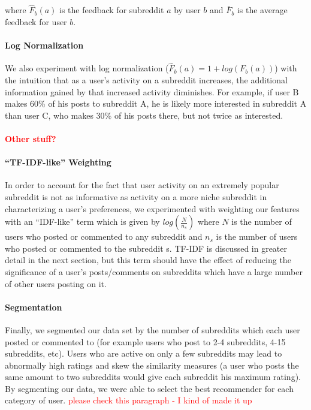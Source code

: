 \documentclass{article}
\begin{document}
where $\hat{F}_{b}(a)$ is the feedback for subreddit $a$ by user $b$ and $\bar{F}_b$ is the average feedback for user $b$.

\paragraph{Log Normalization} We also experiment with log normalization ($\hat{F}_{b}(a) = 1 + log(F_{b}(a))$) with the intuition that as a user's activity on a subreddit increases, the additional information gained by that increased activity diminishes.  For example, if user B makes 60\% of his posts to subreddit A, he is likely more interested in subreddit A than user C, who makes 30\% of his posts there, but not twice as interested.

\paragraph{\textcolor{red}{Other stuff?} }
\paragraph{“TF-IDF-like” Weighting} In order to account for the fact that user activity on an extremely popular subreddit is not as informative as activity on a more niche subreddit in characterizing a user’s preferences, we experimented with weighting our features with an “IDF-like” term which is given by $log(\frac{N}{n_s})$ where $N$ is the number of users who posted or commented to any subreddit and $n_s$ is the number of users who posted or commented to the subreddit s.  TF-IDF is discussed in greater detail in the next section, but this term should have the effect of reducing the significance of a user's posts/comments on subreddits which have a large number of other users posting on it. 

\paragraph{Segmentation} Finally, we segmented our data set by the number of subreddits which each user posted or commented to (for example users who post to 2-4 subreddits, 4-15 subreddits, etc).  Users who are active on only a few subreddits may lead to abnormally high ratings and skew the similarity measures (a user who posts the same amount to two subreddits would give each subreddit his maximum rating).  By segmenting our data, we were able to select the best recommender for each category of user. \textcolor{red}{please check this paragraph - I kind of made it up}
\end{document}

